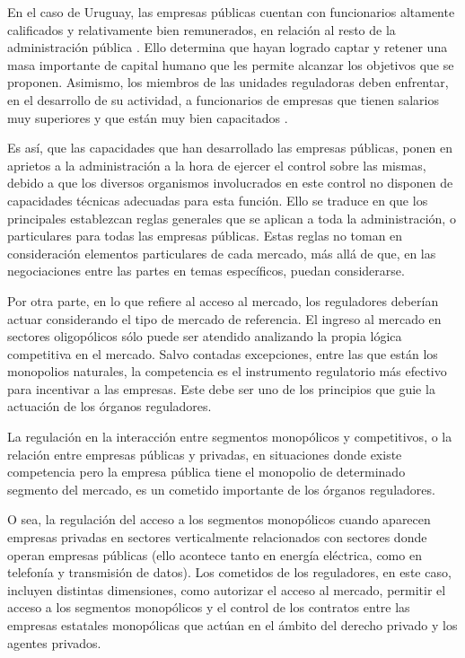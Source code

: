 \documentclass[
  12pt,
  spanish,
]{book}
\begin{document}
En el caso de Uruguay, las empresas públicas cuentan con funcionarios altamente calificados y relativamente bien remunerados, en relación al resto de la administración pública \citep{Bergara2005}. Ello determina que hayan logrado captar y retener una masa importante de capital humano que les permite alcanzar los objetivos que se proponen. Asimismo, los miembros de las unidades reguladoras deben enfrentar, en el desarrollo de su actividad, a funcionarios de empresas que tienen salarios muy superiores y que están muy bien capacitados \citep{Bergara2005}.

Es así, que las capacidades que han desarrollado las empresas públicas, ponen en aprietos a la administración a la hora de ejercer el control sobre las mismas, debido a que los diversos organismos involucrados en este control no disponen de capacidades técnicas adecuadas para esta función. Ello se traduce en que los principales establezcan reglas generales que se aplican a toda la administración, o particulares para todas las empresas públicas. Estas reglas no toman en consideración elementos particulares de cada mercado, más allá de que, en las negociaciones entre las partes en temas específicos, puedan considerarse.

Por otra parte, en lo que refiere al acceso al mercado, los reguladores deberían actuar considerando el tipo de mercado de referencia. El ingreso al mercado en sectores oligopólicos sólo puede ser atendido analizando la propia lógica competitiva en el mercado. Salvo contadas excepciones, entre las que están los monopolios naturales, la competencia es el instrumento regulatorio más efectivo para incentivar a las empresas. Este debe ser uno de los principios que guie la actuación de los órganos reguladores.

La regulación en la interacción entre segmentos monopólicos y competitivos, o la relación entre empresas públicas y privadas, en situaciones donde existe competencia pero la empresa pública tiene el monopolio de determinado segmento del mercado, es un cometido importante de los órganos reguladores.

O sea, la regulación del acceso a los segmentos monopólicos cuando aparecen empresas privadas en sectores verticalmente relacionados con sectores donde operan empresas públicas (ello acontece tanto en energía eléctrica, como en telefonía y transmisión de datos). Los cometidos de los reguladores, en este caso, incluyen distintas dimensiones, como autorizar el acceso al mercado, permitir el acceso a los segmentos monopólicos y el control de los contratos entre las empresas estatales monopólicas que actúan en el ámbito del derecho privado y los agentes privados.
\end{document}
